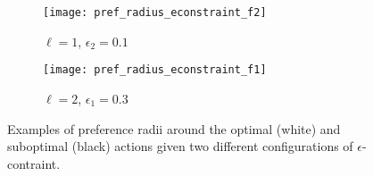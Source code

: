 \begin{figure}[t]
    \centering
    \begin{subfigure}[b]{0.35\textwidth}
        \texttt{[image: pref\_radius\_econstraint\_f2]}
        \caption{$\ell = 1$, $\epsilon_2 = 0.1$}
    \end{subfigure}
    \qquad
    \begin{subfigure}[b]{0.35\textwidth}
        \texttt{[image: pref\_radius\_econstraint\_f1]}
        \caption{$\ell = 2$, $\epsilon_1 = 0.3$}
    \end{subfigure}
    \caption{Examples of preference radii around the optimal (white) and suboptimal (black) actions given two different configurations of $\epsilon$-contraint.}
\label{fig:pref_radius:example:econstraint}
\end{figure}
